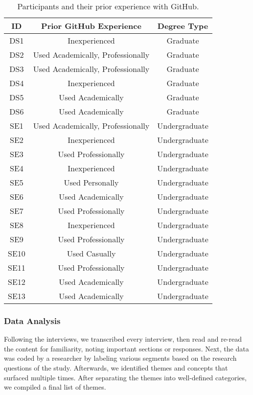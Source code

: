 \begin{table}[h]
    \vspace{1pt}
        \caption{Participants and their prior experience with GitHub.}\label{table:interviews:students}
    \vspace{1pt}
    \begin{center}
        \begin{tabular}{c | c | c}
            \hline
            ID & Prior GitHub Experience & Degree Type \\
            \hline
            DS1 & Inexperienced & Graduate \\ \hline
            DS2 & Used Academically, Professionally & Graduate \\ \hline
            DS3 & Used Academically, Professionally & Graduate \\ \hline
            DS4 & Inexperienced & Graduate \\ \hline
            DS5 & Used Academically & Graduate \\ \hline
            DS6 & Used Academically & Graduate \\ \hline
            SE1 & Used Academically, Professionally & Undergraduate \\ \hline
            SE2 & Inexperienced & Undergraduate \\ \hline
            SE3 & Used Professionally & Undergraduate \\ \hline
            SE4 & Inexperienced & Undergraduate \\ \hline
            SE5 & Used Personally & Undergraduate \\ \hline
            SE6 & Used Academically & Undergraduate \\ \hline
            SE7 & Used Professionally & Undergraduate \\ \hline
            SE8 & Inexperienced & Undergraduate \\ \hline
            SE9 & Used Professionally & Undergraduate \\ \hline
            SE10 & Used Casually & Undergraduate \\ \hline
            SE11 & Used Professionally & Undergraduate \\ \hline
            SE12 & Used Academically & Undergraduate \\ \hline
            SE13 & Used Academically & Undergraduate \\ \hline
        \end{tabular}
    \end{center}
\end{table}

\subsubsection{Data Analysis}
Following the interviews, we transcribed every interview, then read and re-read the content for familiarity, noting important sections or responses. Next, the data was coded by a researcher by labeling various segments based on the research questions of the study. Afterwards, we identified themes and concepts that surfaced multiple times. After separating the themes into well-defined categories, we compiled a final list of themes.
